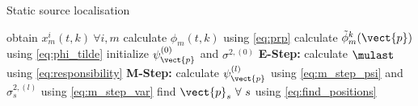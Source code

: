 \begin{algorithm}[h]
\label{alg:loc}
\caption{Static source localisation}
\begin{algorithmic}
    \State obtain $x^i_m(t,k)\ \forall i,m$
    \State calculate $\phi_m(t,k)$ using \eqref{eq:prp}
    \State calculate $\tilde\phi_m^k(\vect{p})$ using \eqref{eq:phi_tilde}
    \State initialize $\psi_{\vect{p}}^{(0)}$ and $\sigma^{2,(0)}$
    \State \textbf{E-Step:} calculate $\mulast$ using \eqref{eq:responsibility}
    \State \textbf{M-Step:} calculate $\psi^{(l)}_\vect{p}$ using \eqref{eq:m_step_psi} and $\sigma_{s}^{2,(l)}$ using \eqref{eq:m_step_var}
    \EndFor
    \State find $\vect{p}_s\ \forall\ s$ using \eqref{eq:find_positions}
\end{algorithmic}
\end{algorithm}